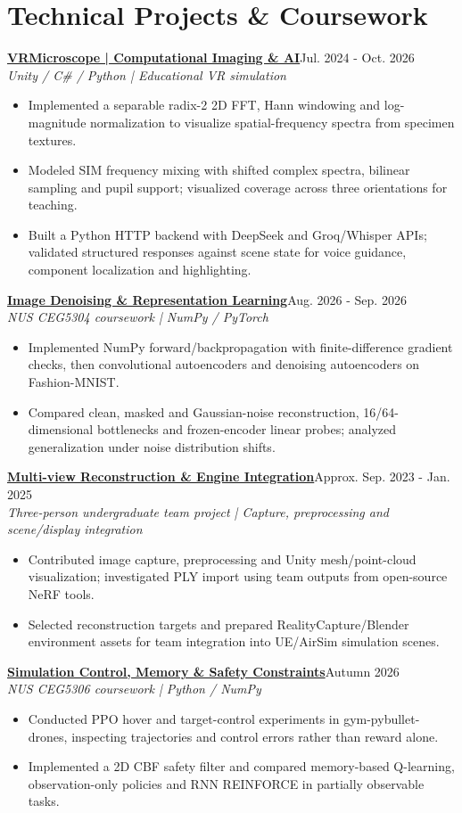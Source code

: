 \documentclass[a4paper,11pt]{article}
\newcommand{\resumeSubheading}[3]{\textbf{#1}\hfill{\small #3}\\{\small\textit{#2}}\par\vspace{3pt}}
\newcommand{\resumeItemListStart}{\begin{itemize}[leftmargin=13pt,label=\textbullet,itemsep=2.5pt,topsep=3pt,parsep=0pt]\fontsize{10.5pt}{13.2pt}\selectfont}
\newcommand{\resumeItemListEnd}{\end{itemize}\vspace{2pt}}
\newcommand{\resumeItem}[1]{\item #1}
\begin{document}
\section{Technical Projects \& Coursework}
\resumeSubheading{\href{https://github.com/Zukunft39/VRMicroscope}{VRMicroscope | Computational Imaging \& AI}}{Unity / C\# / Python | Educational VR simulation}{Jul. 2024 - Oct. 2026}
\resumeItemListStart
\resumeItem{Implemented a separable radix-2 2D FFT, Hann windowing and log-magnitude normalization to visualize spatial-frequency spectra from specimen textures.}
\resumeItem{Modeled SIM frequency mixing with shifted complex spectra, bilinear sampling and pupil support; visualized coverage across three orientations for teaching.}
\resumeItem{Built a Python HTTP backend with DeepSeek and Groq/Whisper APIs; validated structured responses against scene state for voice guidance, component localization and highlighting.}
\resumeItemListEnd
\resumeSubheading{\href{https://zukunft39.github.io/projects/denoising.html}{Image Denoising \& Representation Learning}}{NUS CEG5304 coursework | NumPy / PyTorch}{Aug. 2026 - Sep. 2026}
\resumeItemListStart
\resumeItem{Implemented NumPy forward/backpropagation with finite-difference gradient checks, then convolutional autoencoders and denoising autoencoders on Fashion-MNIST.}
\resumeItem{Compared clean, masked and Gaussian-noise reconstruction, 16/64-dimensional bottlenecks and frozen-encoder linear probes; analyzed generalization under noise distribution shifts.}
\resumeItemListEnd
\resumeSubheading{\href{https://zukunft39.github.io/projects/reconstruction.html}{Multi-view Reconstruction \& Engine Integration}}{Three-person undergraduate team project | Capture, preprocessing and scene/display integration}{Approx. Sep. 2023 - Jan. 2025}
\resumeItemListStart
\resumeItem{Contributed image capture, preprocessing and Unity mesh/point-cloud visualization; investigated PLY import using team outputs from open-source NeRF tools.}
\resumeItem{Selected reconstruction targets and prepared RealityCapture/Blender environment assets for team integration into UE/AirSim simulation scenes.}
\resumeItemListEnd
\resumeSubheading{\href{https://zukunft39.github.io/projects/control.html}{Simulation Control, Memory \& Safety Constraints}}{NUS CEG5306 coursework | Python / NumPy}{Autumn 2026}
\resumeItemListStart
\resumeItem{Conducted PPO hover and target-control experiments in gym-pybullet-drones, inspecting trajectories and control errors rather than reward alone.}
\resumeItem{Implemented a 2D CBF safety filter and compared memory-based Q-learning, observation-only policies and RNN REINFORCE in partially observable tasks.}
\resumeItemListEnd
\end{document}

